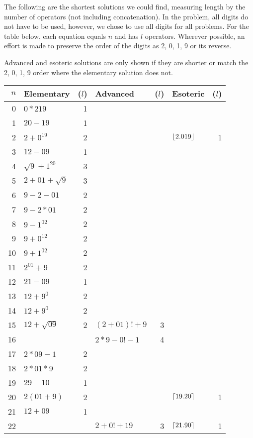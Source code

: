 The following are the shortest solutions we could find, measuring length by the number of operators (not including concatenation).
In the problem, all digits do not have to be used, however, we chose to use all digits for all problems.
For the table below, each equation equals $n$ and has $l$ operators.
Wherever possible, an effort is made to preserve the order of the digits as 2, 0, 1, 9 or its reverse.

Advanced and esoteric solutions are only shown if they are shorter or match the 2, 0, 1, 9 order where the elementary solution does not.

\begin{longtable}{r l r l r l r}
\toprule
$n$ & Elementary & ($l$) & Advanced & ($l$) & Esoteric & ($l$) \\ \midrule
\endhead%
0 & $0*219$ & 1 \\ \midrule
1 & $20-19$ & 1 \\ \midrule
2 & $2+0^{19}$ & 2 & & & $\lfloor2.019\rfloor$ & 1 \\ \midrule
3 & $12-09$ & 1 \\ \midrule
4 & $\sqrt{9}+1^{20}$ & 3 \\ \midrule
5 & $2+01+\sqrt{9}$ & 3 \\ \midrule
6 & $9-2-01$ & 2 \\ \midrule
7 & $9-2*01$ & 2 \\ \midrule
8 & $9-1^{02}$ & 2 \\ \midrule
9 & $9+0^{12}$ & 2 \\ \midrule
\midrule
10 & $9+1^{02}$ & 2 \\ \midrule
11 & $2^{01}+9$ & 2 \\ \midrule
12 & $21-09$ & 1 \\ \midrule
13 & $12+9^0$ & 2 \\ \midrule
14 & $12+9^0$ & 2 \\ \midrule
15 & $12+\sqrt{09}$ & 2 & $(2+01)!+9$ & 3 \\ \midrule
16 & & & $2*9-0!-1$ & 4 \\ \midrule
17 & $2*09-1$ & 2& \\ \midrule
18 & $2*01*9$ & 2 \\ \midrule
19 & $29-10$ & 1 \\ \midrule
\midrule
20 & $2(01+9)$ & 2 & & & $\lceil19.20\rceil$ & 1 \\ \midrule
21 & $12+09$ & 1 \\ \midrule
22 & & & $2+0!+19$ & 3 & $\lceil21.90\rceil$ & 1 \\ \midrule

\end{longtable}
